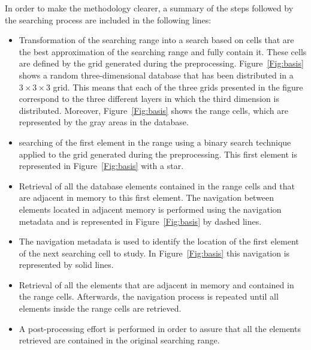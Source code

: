 \documentclass[preprint,12pt]{elsarticle}
\begin{document}
In order to make the methodology clearer, a summary of the steps followed by the searching process are included in the following lines:
\begin{itemize}
  \item Transformation of the searching range into a search based on cells that are the best approximation of the searching range and fully contain it. These cells are defined by the grid generated during the preprocessing. Figure~\ref{Fig:basis} shows a random three-dimensional database that has been distributed in a $3\times3\times3$ grid. This means that each of the three grids presented in the figure correspond to the three different layers in which the third dimension is distributed. Moreover, Figure~\ref{Fig:basis} shows the range cells, which are represented by the gray areas in the database.
  \item searching of the first element in the range using a binary search technique applied to the grid generated during the preprocessing. This first element is represented in Figure~\ref{Fig:basis} with a star.
  \item Retrieval of all the database elements contained in the range cells and that are adjacent in memory to this first element. The navigation between elements located in adjacent memory is performed using the navigation metadata and is represented in Figure~\ref{Fig:basis} by dashed lines.
  \item The navigation metadata is used to identify the location of the first element of the next searching cell to study. In Figure~\ref{Fig:basis} this navigation is represented by solid lines.
  \item Retrieval of all the elements that are adjacent in memory and contained in the range cells. Afterwards, the navigation process is repeated until all elements inside the range cells are retrieved. 
  \item A post-processing effort is performed in order to assure that all the elements retrieved are contained in the original searching range. 
\end{itemize}
\end{document}

